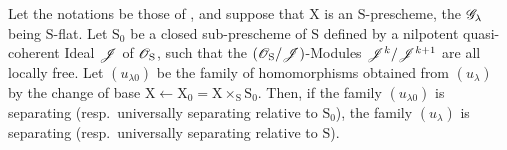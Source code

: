 \begin{proposition}[11.9.15]
\label{IV.11.9.15}
Let the notations be those of , and suppose that $\mathrm{X}$ is an $\mathrm{S}$-prescheme, the $\mathscr{G}_\lambda$ being $\mathrm{S}$-flat.
Let $\mathrm{S}_0$ be a closed sub-prescheme of $\mathrm{S}$ defined by a nilpotent quasi-coherent Ideal $\mathscr{J}$ of $\mathscr{O}_\mathrm{S}$, such that the $(\mathscr{O}_\mathrm{S}/\mathscr{J})$-Modules $\mathscr{J}^k/\mathscr{J}^{k+1}$ are all locally free.
Let $(u_{\lambda 0})$ be the family of homomorphisms obtained from $(u_\lambda)$ by the change of base $\mathrm{X}\leftarrow\mathrm{X}_0=\mathrm{X}\times_\mathrm{S}\mathrm{S}_0$.
Then, if the family $(u_{\lambda 0})$ is separating \textup{(resp.}\ universally separating relative to $\mathrm{S}_0$\textup{)}, the family $(u_\lambda)$ is separating \textup{(resp.}\ universally separating relative to $\mathrm{S}$\textup{)}.
\end{proposition}


